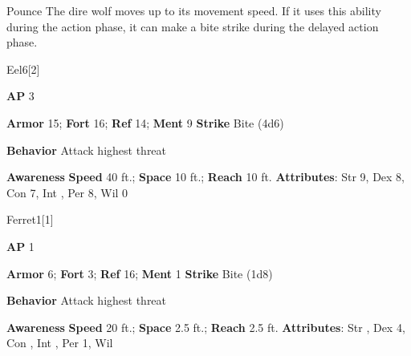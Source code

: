 \begin{freeability}{Pounce}
The dire wolf moves up to its movement speed.
If it uses this ability during the action phase, it can make a bite strike during the delayed action phase.
\end{freeability}

\begin{monsection}{Eel}{6}[2]
\vspace{-1em}\vspace{-1em}
\begin{spellcontent}
\begin{spelltargetinginfo}
{\textbf{AP} 3}

\pari \textbf{Armor} 15;
\textbf{Fort} 16;
\textbf{Ref} 14;
\textbf{Ment} 9
\pari \textbf{Strike} Bite  (4d6)



\pari \textbf{Behavior} Attack highest threat
\end{spelltargetinginfo}
\end{spellcontent}

\begin{monsterfooter}
\pari \textbf{Awareness} 
\pari \textbf{Speed} 40 ft.;
\textbf{Space} 10 ft.;
\textbf{Reach} 10 ft.
\pari \textbf{Attributes}:
Str 9,
Dex 8,
Con 7,
Int ,
Per 8,
Wil 0
\end{monsterfooter}
\end{monsection}

\begin{monsection}{Ferret}{1}[1]
\vspace{-1em}\vspace{-1em}
\begin{spellcontent}
\begin{spelltargetinginfo}
{\textbf{AP} 1}

\pari \textbf{Armor} 6;
\textbf{Fort} 3;
\textbf{Ref} 16;
\textbf{Ment} 1
\pari \textbf{Strike} Bite  (1d8)



\pari \textbf{Behavior} Attack highest threat
\end{spelltargetinginfo}
\end{spellcontent}

\begin{monsterfooter}
\pari \textbf{Awareness} 
\pari \textbf{Speed} 20 ft.;
\textbf{Space} 2.5 ft.;
\textbf{Reach} 2.5 ft.
\pari \textbf{Attributes}:
Str ,
Dex 4,
Con ,
Int ,
Per 1,
Wil 
\end{monsterfooter}
\end{monsection}


